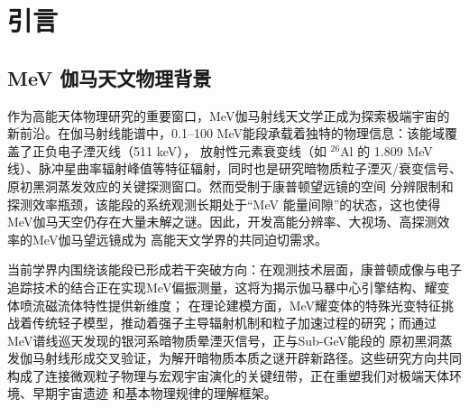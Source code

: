 \chapter{引言}
\label{chap:introduction}
\section{MeV 伽马天文物理背景}
\label{sec:meaning}

作为高能天体物理研究的重要窗口，MeV伽马射线天文学正成为探索极端宇宙的新前沿。在伽马射线能谱中，0.1--100 MeV能段承载着独特的物理信息：该能域覆盖了正负电子湮灭线（511 keV），
放射性元素衰变线（如 $^{26}$Al 的 1.809 MeV 线）、脉冲星曲率辐射峰值等特征辐射，同时也是研究暗物质粒子湮灭/衰变信号、原初黑洞蒸发效应的关键探测窗口。然而受制于康普顿望远镜的空间
分辨限制和探测效率瓶颈，该能段的系统观测长期处于“MeV 能量间隙”的状态，这也使得MeV伽马天空仍存在大量未解之谜。因此，开发高能分辨率、大视场、高探测效率的MeV伽马望远镜成为
高能天文学界的共同迫切需求。\par
当前学界内围绕该能段已形成若干突破方向：在观测技术层面，康普顿成像与电子追踪技术的结合正在实现MeV偏振测量，这将为揭示伽马暴中心引擎结构、耀变体喷流磁流体特性提供新维度；
在理论建模方面，MeV耀变体的特殊光变特征挑战着传统轻子模型，推动着强子主导辐射机制和粒子加速过程的研究；而通过MeV谱线巡天发现的银河系暗物质晕湮灭信号，正与Sub-GeV能段的
原初黑洞蒸发伽马射线形成交叉验证，为解开暗物质本质之谜开辟新路径。这些研究方向共同构成了连接微观粒子物理与宏观宇宙演化的关键纽带，正在重塑我们对极端天体环境、早期宇宙遗迹
和基本物理规律的理解框架。\par
